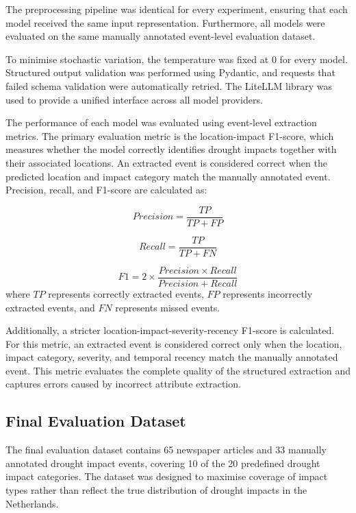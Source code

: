 The preprocessing pipeline was identical for every experiment, ensuring that each model received the same input representation. Furthermore, all models were evaluated on the same manually annotated event-level evaluation dataset.

To minimise stochastic variation, the temperature was fixed at 0 for every model. Structured output validation was performed using Pydantic, and requests that failed schema validation were automatically retried. The LiteLLM library was used to provide a unified interface across all model providers.

The performance of each model was evaluated using event-level extraction metrics. The primary evaluation metric is the location-impact F1-score, which measures whether the model correctly identifies drought impacts together with their associated locations. An extracted event is considered correct when the predicted location and impact category match the manually annotated event. Precision, recall, and F1-score are calculated as:

\[
Precision = \frac{TP}{TP + FP}
\]

\[
Recall = \frac{TP}{TP + FN}
\]

\[
F1 = 2 \times \frac{Precision \times Recall}{Precision + Recall}
\]where $TP$ represents correctly extracted events, $FP$ represents incorrectly extracted events, and $FN$ represents missed events.

Additionally, a stricter location-impact-severity-recency F1-score is calculated. For this metric, an extracted event is considered correct only when the location, impact category, severity, and temporal recency match the manually annotated event. This metric evaluates the complete quality of the structured extraction and captures errors caused by incorrect attribute extraction.








\subsection{Final Evaluation Dataset}
\label{subsubsec:final_dataset}

The final evaluation dataset contains 65 newspaper articles and 33 manually annotated drought impact events, covering 10 of the 20 predefined drought impact categories. The dataset was designed to maximise coverage of impact types rather than reflect the true distribution of drought impacts in the Netherlands.

